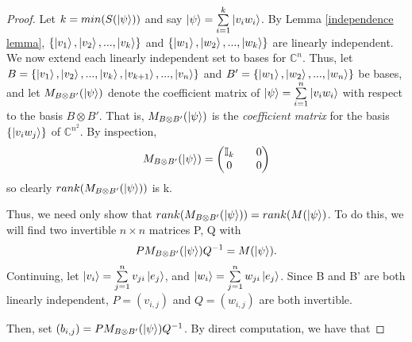 \begin{proof}
Let $k=min(S(\ket{\psi}))$ and say $\ket{\psi}=\sum\limits_{i=1}^k \ket{v_i w_i}$. By Lemma \ref{independence lemma}, $\{\ket{v_1}, \ket{v_2},...,\ket{v_k}\}$ and $\{\ket{w_1}, \ket{w_2},...,\ket{w_k}\}$ are linearly independent.  We now extend each linearly independent set to bases for $\mathbb{C}^n$. Thus, let $B=\{\ket{v_1}, \ket{v_2},...,\ket{v_k}, \ket{v_{k+1}},...,\ket{v_n}\}$ and $B'=\{\ket{w_1}, \ket{w_2},...,\ket{w_n}\}$ be bases, and let $M_{B \otimes B'}(\ket{\psi})$ denote the coefficient matrix of $\ket{\psi}=\sum\limits_{i=1}^{n}\ket{v_i w_i}$ with respect to the basis $B \otimes B'$. That is, $M_{B \otimes B'}(\ket{\psi})$ is the {\emph{coefficient matrix}} for the basis $\{\ket{v_i w_j} \}$ of ${\mathbb{C}}^{n^2}$.  By inspection, 
$$M_{B \otimes B'}(\ket{\psi})=\begin{pmatrix}
\mathbb{I}_k && 0 \\
0 && 0
\end{pmatrix}$$
so clearly $rank(M_{B \otimes B'}(\ket{\psi}))$ is k.

Thus, we need only show that $rank(M_{B \otimes B'}(\ket{\psi}))=rank(M(\ket{\psi})$.  To do this, we will find two invertible $n \times n$ matrices P, Q with 
\begin{equation}
PM_{B \otimes B'}(\ket{\psi})Q^{-1}=M(\ket{\psi}).
\end{equation}
Continuing, let $\ket{v_i}=\sum\limits_{j=1}^n v_{ji}\ket{e_j}$, and
$\ket{w_i}=\sum\limits_{j=1}^n w_{ji}\ket{e_j}$.  Since B and B' are both linearly independent, $P=(v_{i,j})$ and $Q=(w_{i,j})$ are both invertible.


Then, set $(b_{i,j})=PM_{B \otimes B'}(\ket{\psi})Q^{-1}$.  By direct computation, we have that
\begin{comment}


\end{comment}
\end{proof}
